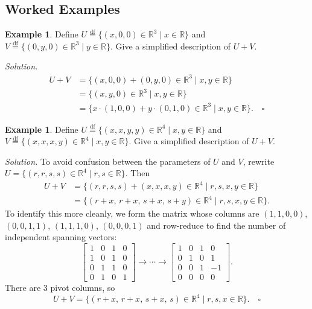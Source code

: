 \documentclass[11pt, a4paper, notitlepage]{report}
\theoremstyle{definition}
\newtheorem{example}[theorem]{Example}
\theoremstyle{remark}
\begin{document}
\subsection{Worked Examples}

\begin{example}\label{ex:sum-R3}
Define $U \stackrel{\mathrm{df}}{=} \{(x,0,0) \in \mathbb{R}^3 \mid x \in \mathbb{R}\}$ and $V \stackrel{\mathrm{df}}{=} \{(0,y,0) \in \mathbb{R}^3 \mid y \in \mathbb{R}\}$. Give a simplified description of $U + V$.

\emph{Solution.}
\begin{align*}
  U + V &= \{(x,0,0) + (0,y,0) \in \mathbb{R}^3 \mid x,y \in \mathbb{R}\} \\
        &= \{(x,y,0) \in \mathbb{R}^3 \mid x,y \in \mathbb{R}\} \\
        &= \{x\cdot(1,0,0) + y\cdot(0,1,0) \in \mathbb{R}^3 \mid x,y \in \mathbb{R}\}. \quad \square
\end{align*}
\end{example}

\begin{example}\label{ex:sum-R4}
Define $U \stackrel{\mathrm{df}}{=} \{(x,x,y,y) \in \mathbb{R}^4 \mid x,y \in \mathbb{R}\}$ and $V \stackrel{\mathrm{df}}{=} \{(x,x,x,y) \in \mathbb{R}^4 \mid x,y \in \mathbb{R}\}$. Give a simplified description of $U + V$.

\emph{Solution.} To avoid confusion between the parameters of $U$ and $V$, rewrite $U = \{(r,r,s,s) \in \mathbb{R}^4 \mid r,s \in \mathbb{R}\}$. Then
\begin{align*}
  U + V &= \{(r,r,s,s) + (x,x,x,y) \in \mathbb{R}^4 \mid r,s,x,y \in \mathbb{R}\} \\
        &= \{(r+x,\, r+x,\, s+x,\, s+y) \in \mathbb{R}^4 \mid r,s,x,y \in \mathbb{R}\}.
\end{align*}
To identify this more cleanly, we form the matrix whose columns are $(1,1,0,0)$, $(0,0,1,1)$, $(1,1,1,0)$, $(0,0,0,1)$ and row-reduce to find the number of independent spanning vectors:
\[
  \begin{bmatrix}1&0&1&0\\1&0&1&0\\0&1&1&0\\0&1&0&1\end{bmatrix}
  \to \cdots \to
  \begin{bmatrix}1&0&1&0\\0&1&0&1\\0&0&1&-1\\0&0&0&0\end{bmatrix}.
\]
There are 3 pivot columns, so
\[
  U + V = \{(r+x,\,r+x,\,s+x,\,s) \in \mathbb{R}^4 \mid r,s,x \in \mathbb{R}\}. \quad \square
\]
\end{example}
\end{document}

